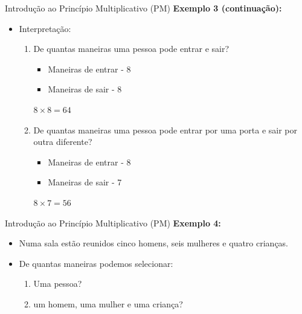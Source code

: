 \documentclass[aspectratio=169]{beamer}
\begin{document}
\begin{frame}{Introdução ao Princípio Multiplicativo (PM)}
    \textbf{Exemplo 3 (continuação):}

    \vspace{2mm}
        \begin{itemize}
            \item Interpretação:
            \begin{enumerate}[a]
                \item De quantas maneiras uma pessoa pode entrar e sair?
                
                \begin{multicols}{2}
                    \begin{itemize}
                        \item[] Maneiras de entrar - 8
                        \item[] Maneiras de sair - 8
                    \end{itemize}
                    \columnbreak

                    $8 \times 8 = 64$
                \end{multicols}

                \item De quantas maneiras uma pessoa pode entrar por uma porta e sair por outra diferente?
                
                \begin{multicols}{2}
                    \begin{itemize}
                        \item[] Maneiras de entrar - 8
                        \item[] Maneiras de sair - 7
                    \end{itemize}
                    \columnbreak

                    \vspace{2mm}

                    $8 \times 7 = 56$
                \end{multicols}
            \end{enumerate}
        \end{itemize}
\end{frame}


\begin{frame}{Introdução ao Princípio Multiplicativo (PM)}
    \textbf{Exemplo 4:}

    \vspace{2mm}
        \begin{itemize}
            \item Numa sala estão reunidos cinco homens, seis mulheres e quatro crianças.
            \item De quantas maneiras podemos selecionar:
            \begin{enumerate}[a]
                \item Uma pessoa?
                \item um homem, uma mulher e uma criança?
            \end{enumerate}
        \end{itemize}
\end{frame}
\end{document}
